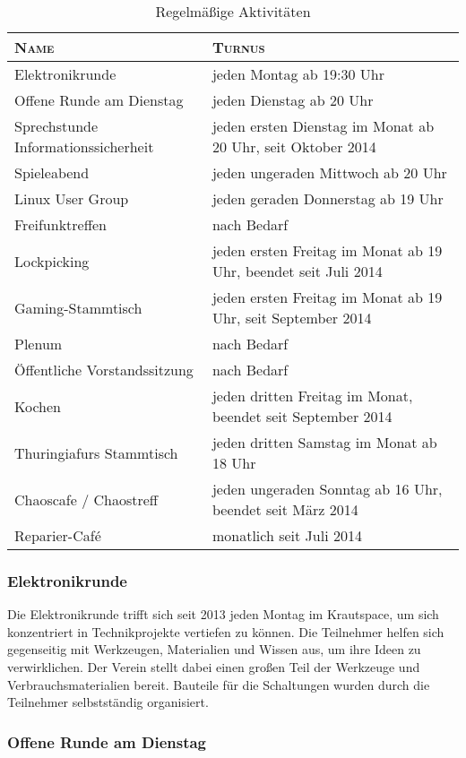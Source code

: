 \documentclass[ngerman]{scrartcl}
\begin{document}
\begin{table}[h]
  \centering{}
	\begin{tabularx}{\textwidth}{l|X}
          \toprule
		\textsc{Name} & \textsc{Turnus} \\ \midrule
		Elektronikrunde & jeden Montag ab 19:30 Uhr\\
		Offene Runde am Dienstag & jeden Dienstag ab 20 Uhr\\
		Sprechstunde Informationssicherheit & jeden ersten Dienstag im Monat ab 20 Uhr, seit Oktober 2014\\ 
		Spieleabend & jeden ungeraden Mittwoch ab 20 Uhr\\
		Linux User Group & jeden geraden Donnerstag ab 19 Uhr\\
		Freifunktreffen & nach Bedarf\\
		Lockpicking & jeden ersten Freitag im Monat ab 19 Uhr, beendet seit Juli 2014\\
		Gaming-Stammtisch & jeden ersten Freitag im Monat ab 19 Uhr, seit September 2014\\
                Plenum & nach Bedarf\\
		Öffentliche Vorstandssitzung & nach Bedarf\\
		Kochen & jeden dritten Freitag im Monat, beendet seit September 2014\\
		Thuringiafurs Stammtisch & jeden dritten Samstag im Monat ab 18 Uhr\\
		Chaoscafe / Chaostreff & jeden ungeraden Sonntag ab 16 Uhr, beendet seit März 2014\\
		Reparier-Café & monatlich seit Juli 2014\\
\bottomrule
\end{tabularx}
\caption{Regelmäßige Aktivitäten}
\end{table}

\subsubsection{Elektronikrunde}

Die Elektronikrunde trifft sich seit 2013 jeden Montag im Krautspace, um
sich konzentriert in Technikprojekte vertiefen zu können. Die
Teilnehmer helfen sich gegenseitig mit Werkzeugen, Materialien und
Wissen aus, um ihre Ideen zu verwirklichen. Der Verein stellt dabei
einen großen Teil der Werkzeuge und Verbrauchsmaterialien bereit.
Bauteile für die Schaltungen wurden durch die Teilnehmer selbstständig
organisiert.

\subsubsection{Offene Runde am Dienstag}
\end{document}
